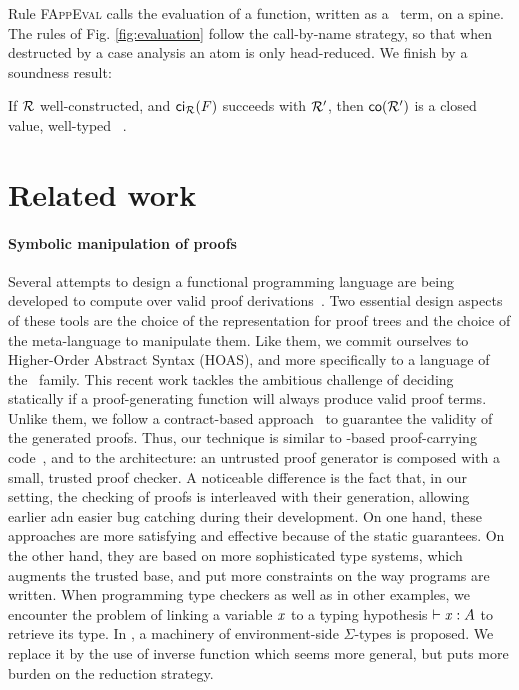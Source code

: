\documentclass{llncs}
\begin{document}
Rule \textsc{FAppEval} calls the evaluation of a function, written as
a \CL\ term, on a spine. The rules of Fig. \ref{fig:evaluation} follow
the call-by-name strategy, so that when destructed by a case analysis
an atom is only head-reduced. We finish by a soundness result:

\begin{theorem}
  If $\mathcal{R}$ well-constructed, and ${\text{\textsf{ci$_{\mathcal{R}}$}}}({F})$ succeeds with $\mathcal{R'}$,
  then ${\text{\textsf{co}}}({\mathcal{R'}})$ is a closed value, well-typed \wrt\ \LF.
\end{theorem}

\section{Related work}

\paragraph{Symbolic manipulation of proofs}

Several attempts to design a functional programming language are being
developed to compute over valid proof
derivations~\cite{cave2012,stampoulis2012,poswolsky2008}. Two
essential design aspects of these tools are the choice of the
representation for proof trees and the choice of the meta-language to
manipulate them. Like them, we commit ourselves to Higher-Order
Abstract Syntax (HOAS), and more specifically to a language of the
\LF\ family. This recent work tackles the ambitious challenge of
deciding statically if a proof-generating function will always produce
valid proof terms. Unlike them, we follow a contract-based
approach~\cite{wadler2009well} to guarantee the validity of the
generated proofs. Thus, our technique is similar to \LF-based
proof-carrying code~\cite{necula1997proof,appel1999proof}, and to the
 architecture: an untrusted proof generator is composed
with a small, trusted proof checker. A noticeable difference is the
fact that, in our setting, the checking of proofs is interleaved with
their generation, allowing earlier adn easier bug catching during
their development. On one hand, these approaches are more satisfying
and effective because of the static guarantees. On the other hand,
they are based on more sophisticated type systems, which augments the
trusted base, and put more constraints on the way programs are
written. When programming type checkers as well as in other examples,
we encounter the problem of linking a variable $\text{\textit{x}}$ to a typing
hypothesis $\vdash \text{\textit{x}} : A$ to retrieve its type. In
\cite{cave2012}, a machinery of environment-side $\Sigma$-types is
proposed. We replace it by the use of inverse function which seems
more general, but puts more burden on the reduction strategy.
\end{document}
